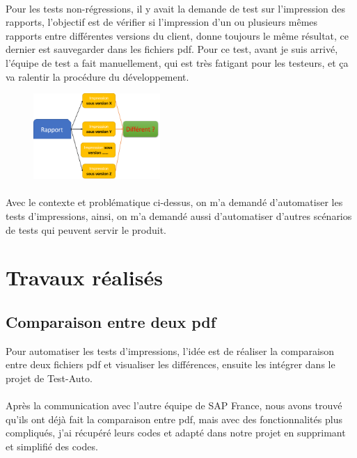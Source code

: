 \documentclass[french]{article}
\begin{document}
	\paragraph*{}
	Pour les tests non-régressions, il y avait la demande de test sur l'impression des rapports, l'objectif est de vérifier si l'impression d'un ou plusieurs mêmes rapports entre différentes versions du client, donne toujours le même résultat, ce dernier est sauvegarder dans les fichiers pdf. Pour ce test, avant je suis arrivé, l'équipe de test a fait manuellement, qui est très fatigant pour les testeurs, et ça va ralentir la procédure du développement. 
	\begin{figure}[H]
		\centering
		\includegraphics[width=0.43\textwidth]{problematique_print.png}
		\label{fig:prolematique_TestPrint_label}
	\end{figure}
	
	\paragraph*{}
	Avec le contexte et problématique ci-dessus, on m'a demandé d'automatiser les tests d'impressions, ainsi, on m'a demandé aussi d'automatiser d'autres scénarios de tests qui peuvent servir le produit.
	
	\newpage
	\section{Travaux réalisés}	
	\subsection{Comparaison entre deux pdf}
	Pour automatiser les tests d'impressions, l'idée est de réaliser la comparaison entre deux fichiers pdf et visualiser les différences, ensuite les intégrer dans le projet de Test-Auto. 
	
	\paragraph*{}
	Après la communication avec l'autre équipe de SAP France, nous avons trouvé qu'ils ont déjà fait la comparaison entre pdf, mais avec des fonctionnalités plus compliqués, j'ai récupéré leurs codes et adapté dans notre projet en supprimant et simplifié des codes. 
	
\end{document}
